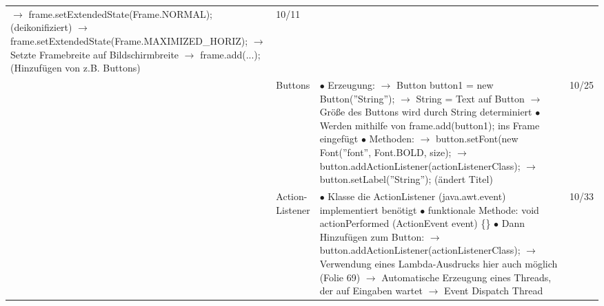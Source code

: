 \documentclass[11pt,a4paper]{article}
\begin{document}
\begin{center}
\begin{longtable}[h]{ | p{2.3cm} | p{2.3cm} | p{12.6cm} | p{1.2cm} | }
{	\hspace{0.4cm} $\rightarrow$ frame.setExtendedState(Frame.NORMAL); (deikonifiziert) \\
	\hspace{0.4cm} $\rightarrow$ frame.setExtendedState(Frame.MAXIMIZED\_HORIZ); \\
	\hspace{0.6cm} $\rightarrow$ Setzte Framebreite auf Bildschirmbreite \\
	\hspace{0.4cm} $\rightarrow$ frame.add(...); (Hinzufügen von z.B. Buttons)}  & 10/11 \\ \cline{2-4}
	
	& Buttons & \makecell[l]{$\bullet$ Erzeugung: \\
	\hspace{0.4cm} $\rightarrow$ Button button1 = new Button(''String'');\\
	\hspace{0.4cm} $\rightarrow$ String = Text auf Button \\
	\hspace{0.4cm} $\rightarrow$ Größe des Buttons wird durch String determiniert \\
	$\bullet$ Werden mithilfe von frame.add(button1); ins Frame eingefügt \\
	$\bullet$ Methoden: \\
	\hspace{0.4cm} $\rightarrow$ button.setFont(new Font(''font'', Font.BOLD, size);\\
	\hspace{0.4cm} $\rightarrow$ button.addActionListener(actionListenerClass); \\
	\hspace{0.4cm} $\rightarrow$ button.setLabel(''String''); (ändert Titel) }  & 10/25 \\ \cline{2-4}
	
	& \makecell[l]{Action- \\ Listener} & \makecell[l]{$\bullet$ Klasse die ActionListener (java.awt.event) implementiert benötigt \\
	$\bullet$ funktionale Methode: void actionPerformed (ActionEvent event) \{\} \\
	$\bullet$ Dann Hinzufügen zum Button: \\
	\hspace{0.4cm} $\rightarrow$ button.addActionListener(actionListenerClass);  \\
	\hspace{0.4cm} $\rightarrow$ Verwendung eines Lambda-Ausdrucks hier auch möglich (Folie 69) \\
	\hspace{0.4cm} $\rightarrow$ Automatische Erzeugung eines Threads, der auf Eingaben wartet \\
	\hspace{0.4cm} $\rightarrow$ Event Dispatch Thread}  & 10/33 \\ \cline{2-4}
	

\end{longtable}
\end{center}
\end{document}
